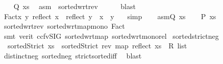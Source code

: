 \begin{isabellebody}
\ \ \isamarkupfalse%
\ {\isachardoublequoteopen}{\isacharquery}{\kern0pt}Q\ xs{\isachardoublequoteclose}\ \isamarkupfalse%
\ asm\ {}\ sorted{\isacharunderscore}{\kern0pt}wrt{\isacharunderscore}{\kern0pt}rev\isanewline
\ \ \ \ \isamarkupfalse%
\ blast\isanewline
{}\isamarkupfalse%
\isanewline
\ \ \isamarkupfalse%
\ Fact{\isacharcolon}{\kern0pt}{\isachardoublequoteopen}{\isasymforall}x\ y{\isachardot}{\kern0pt}\ reflect\ x\ {\isasymge}\ reflect\ y\ {\isasymlongrightarrow}\ x\ {\isasymle}\ y\ {\isachardoublequoteclose}\ \isamarkupfalse%
\ simp\isanewline
\ \ \isamarkupfalse%
\ asm{\isacharcolon}{\kern0pt}{\isachardoublequoteopen}{\isacharquery}{\kern0pt}Q\ xs{\isachardoublequoteclose}\isanewline
\ \ \isamarkupfalse%
\ {\isachardoublequoteopen}{\isacharquery}{\kern0pt}P\ xs{\isachardoublequoteclose}\ \isamarkupfalse%
\ sorted{\isacharunderscore}{\kern0pt}wrt{\isacharunderscore}{\kern0pt}rev\ sorted{\isacharunderscore}{\kern0pt}wrt{\isacharunderscore}{\kern0pt}map{\isacharunderscore}{\kern0pt}mono\ Fact\isanewline
\ \ \ \ \isamarkupfalse%
\ {\isacharparenleft}{\kern0pt}smt\ {\isacharparenleft}{\kern0pt}verit{\isacharcomma}{\kern0pt}\ ccfv{\isacharunderscore}{\kern0pt}SIG{\isacharparenright}{\kern0pt}\ sorted{\isacharunderscore}{\kern0pt}wrt{\isacharunderscore}{\kern0pt}map\ sorted{\isacharunderscore}{\kern0pt}wrt{\isacharunderscore}{\kern0pt}mono{\isacharunderscore}{\kern0pt}rel{\isacharparenright}{\kern0pt}\isanewline
{}\isamarkupfalse%
%
\endisatagproof
{\isafoldproof}%
%
\isadelimproof
\isanewline
%
\endisadelimproof
\isanewline
{}\isamarkupfalse%
\ sortedstrict{\isacharunderscore}{\kern0pt}neg{\isacharcolon}{\kern0pt}\isanewline
\ \ {\isachardoublequoteopen}sortedStrict\ xs\ {\isacharequal}{\kern0pt}\ sortedStrict\ {\isacharparenleft}{\kern0pt}rev\ {\isacharparenleft}{\kern0pt}map\ reflect\ {\isacharparenleft}{\kern0pt}xs\ {\isacharcolon}{\kern0pt}{\isacharcolon}{\kern0pt}\ R{}\ list{\isacharparenright}{\kern0pt}{\isacharparenright}{\kern0pt}{\isacharparenright}{\kern0pt}{\isachardoublequoteclose}\ \isanewline
%
\isadelimproof
\ \ %
\endisadelimproof
%
\isatagproof
{}\isamarkupfalse%
\ distinct{\isacharunderscore}{\kern0pt}neg\ sorted{\isacharunderscore}{\kern0pt}neg\ strict{\isacharunderscore}{\kern0pt}sorted{\isacharunderscore}{\kern0pt}iff\ \isamarkupfalse%
\ blast%

\end{isabellebody}
